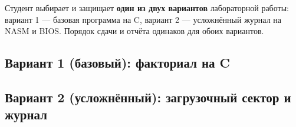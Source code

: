 \label{seminar04}
Студент выбирает и защищает \textbf{один из двух вариантов} лабораторной работы:
вариант 1 --- базовая программа на C, вариант 2 --- усложнённый журнал
на NASM и BIOS. Порядок сдачи и отчёта одинаков для обоих вариантов.

\begingroup
\setlength{\emergencystretch}{2em}
\providecommand{\tightlist}{\setlength{\itemsep}{0pt}\setlength{\parskip}{0pt}}
\subsection{Вариант 1 (базовый): факториал на C}

\clearpage
\subsection{Вариант 2 (усложнённый): загрузочный сектор и журнал}

\endgroup
